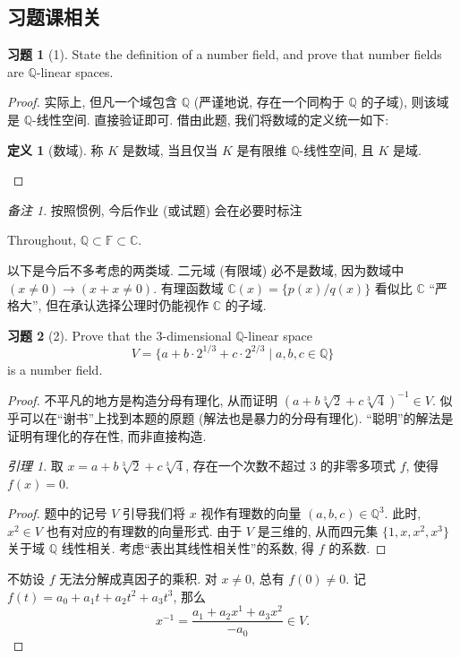 \documentclass[11pt]{ctexart}
\theoremstyle{definition}
\numberwithin{equation}{section}
\theoremstyle{definition}
\newtheorem*{definition}{定义}
\newtheorem*{exercise}{习题}
\theoremstyle{remark}
\newtheorem*{remark}{备注}
\newtheorem*{lemma}{引理}
\begin{document}
\subsection{习题课相关}

\begin{exercise}[1]
    State the definition of a number field, and prove that number fields are $\mathbb Q$-linear spaces. 
    \begin{proof}
        实际上, 但凡一个域包含 $\mathbb Q$ (严谨地说, 存在一个同构于 $\mathbb Q$ 的子域), 则该域是 $\mathbb Q$-线性空间. 直接验证即可. 借由此题, 我们将数域的定义统一如下: 
        \begin{pinked}
            \begin{definition}[数域]
                称 $K$ 是数域, 当且仅当 $K$ 是有限维 $\mathbb Q$-线性空间, 且 $K$ 是域. 
            \end{definition}
        \end{pinked}
    \end{proof}
\end{exercise}

\begin{remark}
    按照惯例, 今后作业 (或试题) 会在必要时标注
    \begin{pinked}
        Throughout, $\mathbb Q\subset \mathbb F\subset \mathbb C$. 
    \end{pinked}
以下是今后不多考虑的两类域. 二元域 (有限域) 必不是数域, 因为数域中 $(x\neq 0)\to (x+x\neq 0)$. 有理函数域 $\mathbb C(x)=\{p(x)/q(x)\}$ 看似比 $\mathbb C$ ``严格大'', 但在承认选择公理时仍能视作 $\mathbb C$ 的子域. 
\end{remark}

\begin{exercise}[2]
    Prove that the $3$-dimensional $\mathbb Q$-linear space
\begin{equation}
    V=\{a+b\cdot 2^{1/3}+c\cdot 2^{2/3}\mid a,b,c\in \mathbb Q\}
\end{equation}
 is a number field.  
 \begin{proof}
    不平凡的地方是构造分母有理化, 从而证明 $(a+b\sqrt[3]2+c\sqrt[3]4)^{-1}\in V$. 似乎可以在``谢书''上找到本题的原题 (解法也是暴力的分母有理化). ``聪明''的解法是证明有理化的存在性, 而非直接构造. 
    \begin{lemma}
        取 $x=a+b\sqrt[3]2+c\sqrt[3]4$, 存在一个次数不超过 $3$ 的非零多项式 $f$, 使得 $f(x)=0$. 
        \begin{proof}
            题中的记号 $V$ 引导我们将 $x$ 视作有理数的向量 $(a,b,c)\in \mathbb Q^3$. 此时, $x^2\in V$ 也有对应的有理数的向量形式. 由于 $V$ 是三维的, 从而四元集 $\{1,x,x^2,x^3\}$ 关于域 $\mathbb Q$ 线性相关. 考虑``表出其线性相关性''的系数, 得 $f$ 的系数. 
        \end{proof}
    \end{lemma}
    不妨设 $f$ 无法分解成真因子的乘积. 对 $x\neq 0$, 总有 $f(0)\neq 0$. 记 $f(t)=a_0+a_1t+a_2t^2+a_3t^3$, 那么
    \begin{equation}
        x^{-1}=\frac{a_1+a_2x^1+a_3x^2}{-a_0}\in V. 
    \end{equation}
 \end{proof}
\end{exercise}
\end{document}
